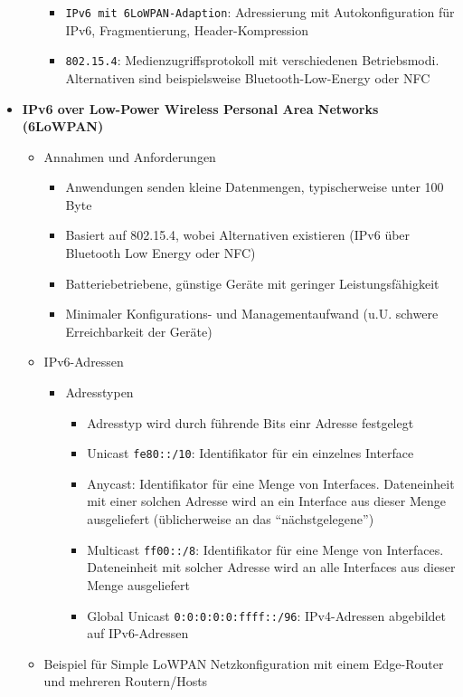 \begin{itemize}
\begin{itemize}
\begin{itemize}
			\item \texttt{IPv6 mit 6LoWPAN-Adaption}: Adressierung mit Autokonfiguration für IPv6, Fragmentierung, Header-Kompression
			\item \texttt{802.15.4}: Medienzugriffsprotokoll mit verschiedenen Betriebsmodi. Alternativen sind beispielsweise Bluetooth-Low-Energy oder NFC
		\end{itemize}
	\end{itemize}
	\item \textbf{IPv6 over Low-Power Wireless Personal Area Networks (6LoWPAN)}
	\begin{itemize}
		\item Annahmen und Anforderungen
		\begin{itemize}
			\item Anwendungen senden kleine Datenmengen, typischerweise unter 100 Byte
			\item Basiert auf 802.15.4, wobei Alternativen existieren (IPv6 über Bluetooth Low Energy oder NFC)
			\item Batteriebetriebene, günstige Geräte mit geringer Leistungsfähigkeit
			\item Minimaler Konfigurations- und Managementaufwand (u.U. schwere Erreichbarkeit der Geräte)
		\end{itemize}
		\item IPv6-Adressen
		\begin{itemize}
			\item Adresstypen
			\begin{itemize}
				\item Adresstyp wird durch führende Bits einr Adresse festgelegt
				\item Unicast \texttt{fe80::/10}: Identifikator für ein einzelnes Interface
				\item Anycast: Identifikator für eine Menge von Interfaces. Dateneinheit mit einer solchen Adresse wird an ein Interface aus dieser Menge ausgeliefert (üblicherweise an das "`nächstgelegene"')
				\item Multicast \texttt{ff00::/8}: Identifikator für eine Menge von Interfaces. Dateneinheit mit solcher Adresse wird an alle Interfaces aus dieser Menge ausgeliefert
				\item Global Unicast \texttt{0:0:0:0:0:ffff::/96}: IPv4-Adressen abgebildet auf IPv6-Adressen
			\end{itemize}
		\end{itemize}
		\item Beispiel für Simple LoWPAN Netzkonfiguration mit einem Edge-Router und mehreren Routern/Hosts

\end{itemize}
\end{itemize}
